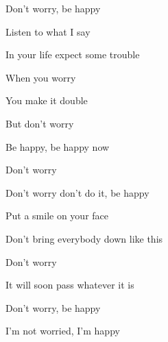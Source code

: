 Don't worry, be happy 

Listen to what I say 

In your life expect some trouble 

When you worry 

You make it double 

But don't worry

Be happy, be happy now
\ks

\zr
\kr

\zs
Don't worry 

Don't worry don't do it, be happy 

Put a smile on your face 

Don't bring everybody down like this 
\ks

\zr
Don't worry

It will soon pass whatever it is 

Don't worry, be happy 

I'm not worried, I'm happy
\kr

\kp
